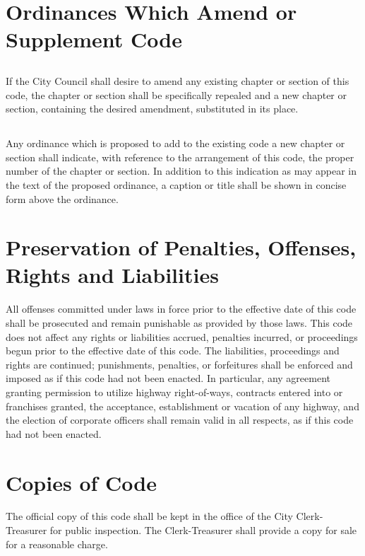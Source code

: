 \section{Ordinances Which Amend or Supplement Code}
\subsection{}
If the City Council shall desire to amend any existing chapter or section of this code, the chapter or section shall be specifically repealed and a new chapter or section, containing the desired amendment, substituted in its place.
\subsection{}
Any ordinance which is proposed to add to the existing code a new chapter or section shall indicate, with reference to the arrangement of this code, the proper number of the chapter or section. In addition to this indication as may appear in the text of the proposed ordinance, a caption or title shall be shown in concise form above the ordinance.



\section{Preservation of Penalties, Offenses, Rights and Liabilities}
All offenses committed under laws in force prior to the effective date of this code shall be prosecuted and remain punishable as provided by those laws.  This code does not affect any rights or liabilities accrued, penalties incurred, or proceedings begun prior to the effective date of this code.  The liabilities, proceedings and rights are continued; punishments, penalties, or forfeitures shall be enforced and imposed as if this code had not been enacted.  In particular, any agreement granting permission to utilize highway right-of-ways, contracts entered into or franchises granted, the acceptance, establishment or vacation of any highway, and the election of corporate officers shall remain valid in all respects, as if this code had not been enacted.



\section{Copies of Code}
The official copy of this code shall be kept in the office of the City Clerk-Treasurer for public inspection.  The Clerk-Treasurer shall provide a copy for sale for a reasonable charge.



